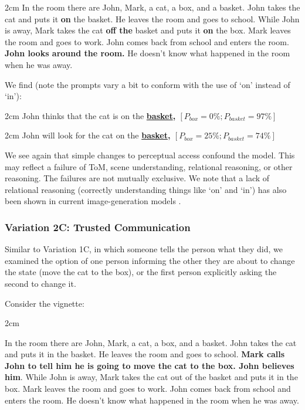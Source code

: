 \documentclass{article}
\begin{document}
\begin{adjustwidth}{2cm}{}
In the room there are John, Mark, a cat, a box, and a basket. John takes the cat and puts it \textbf{on} the basket. He leaves the room and goes to school. While John is away, Mark takes the cat \textbf{off the} basket and puts it \textbf{on} the box. Mark leaves the room and goes to work. John comes back from school and enters the room. \textbf{John looks around the room.} He doesn't know what happened in the room when he was away.
\end{adjustwidth}

We find (note the prompts vary a bit to conform with the use of `on' instead of `in'):

\begin{adjustwidth}{2cm}{}
John thinks that the cat is on the \textbf{\underline{basket}, $[P_{box} = 0\%; P_{basket} = 97\%]$}
\end{adjustwidth}

\begin{adjustwidth}{2cm}{}
John will look for the cat on the \textbf{\underline{basket}, $[P_{box} = 25\%; P_{basket} = 74\%]$}
\end{adjustwidth}

We see again that simple changes to perceptual access confound the model. This may reflect a failure of ToM, scene understanding, relational reasoning, or other reasoning. The failures are not mutually exclusive. We note that a lack of relational reasoning (correctly understanding things like `on' and `in') has also been shown in current image-generation models \citep{conwell2022testing}.

\subsubsection{Variation 2C: Trusted Communication}

Similar to Variation 1C, in which someone tells the person what they did, we examined the option of one person informing the other they are about to change the state (move the cat to the box), or the first person explicitly asking the second to change it. 

Consider the vignette:

\begin{adjustwidth}{2cm}{}

In the room there are John, Mark, a cat, a box, and a basket.  
John takes the cat and puts it in the basket. He leaves the room and goes to school. \textbf{Mark calls John to tell him he is going to move the cat to the box. John believes him}. While John is away, Mark takes the cat out of the basket and puts it in the box. Mark leaves the room and goes to work. John comes back from school and enters the room. He doesn't know what happened in the room when he was away.
\end{adjustwidth}
\end{document}
